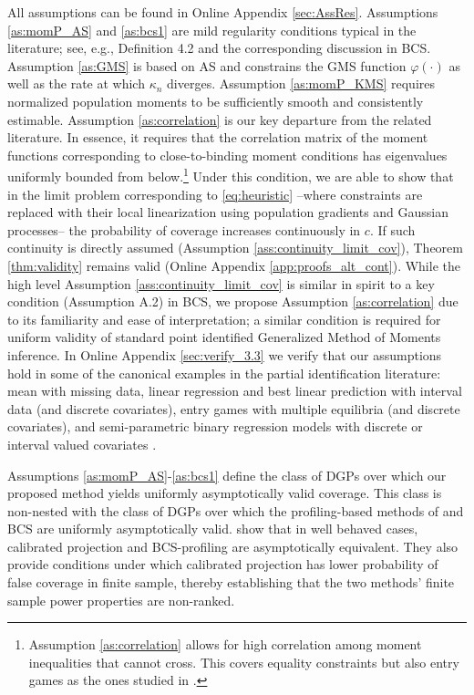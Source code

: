 \documentclass[letterpaper,11pt]{article}
\theoremstyle{myplain}
\theoremstyle{mydefinition}
\theoremstyle{myremark}
\renewcommand{\cite}{\citet}
\numberwithin{equation}{section}
\numberwithin{figure}{section}
\begin{document}
All assumptions can be found in Online Appendix \ref{sec:AssRes}.
Assumptions \ref{as:momP_AS} and \ref{as:bcs1} are mild regularity conditions typical in the literature; see, e.g., Definition 4.2 and the corresponding discussion in BCS.
Assumption \ref{as:GMS} is based on AS and constrains the GMS function $\varphi(\cdot)$ as well as the rate at which $\kappa_n$ diverges.
Assumption \ref{as:momP_KMS} requires normalized population moments to be sufficiently smooth and consistently estimable.
Assumption \ref{as:correlation} is our key departure from the related literature.
In essence, it requires that the correlation matrix of the moment functions corresponding to close-to-binding moment conditions has
eigenvalues uniformly bounded from below.\footnote{Assumption \ref{as:correlation} allows for high correlation among moment inequalities that cannot cross. This covers equality constraints but also entry games as the ones studied in \cite{CilibertoTamer09}.}
Under this condition, we are able to show that in the limit problem corresponding to \eqref{eq:heuristic} --where constraints are replaced with their local linearization using population gradients and Gaussian processes-- the probability of coverage increases continuously in $c$. If such continuity is directly assumed (Assumption \ref{ass:continuity_limit_cov}), Theorem \ref{thm:validity} remains valid (Online Appendix \ref{app:proofs_alt_cont}). While the high level Assumption \ref{ass:continuity_limit_cov} is similar in spirit to a key condition (Assumption A.2) in BCS, we propose Assumption \ref{as:correlation} due to its familiarity and ease of interpretation; a similar condition is required for uniform validity of standard point identified Generalized Method of Moments inference. 
In Online Appendix \ref{sec:verify_3.3} we verify that our assumptions hold in some of the canonical examples in the partial identification literature:  mean with missing data, linear regression and best linear prediction with interval data (and discrete covariates), entry games with multiple equilibria (and discrete covariates), and semi-parametric binary regression models with discrete or interval valued covariates \citep[as in][]{mag:mau08}.

Assumptions \ref{as:momP_AS}-\ref{as:bcs1} define the class of DGPs over which our proposed method  yields uniformly asymptotically valid coverage. This class is non-nested with the class of DGPs over which the profiling-based methods of \cite{Romano_Shaikh2008aJSPIWP} and BCS are uniformly asymptotically valid. \cite[Section 4.2 and Supplemental Appendix F]{KMS_2017} show that in well behaved cases, calibrated projection and BCS-profiling are asymptotically equivalent. They also provide conditions under which calibrated projection has lower probability of false coverage in finite sample, thereby establishing that the two methods' finite sample power properties are non-ranked.
\end{document}
